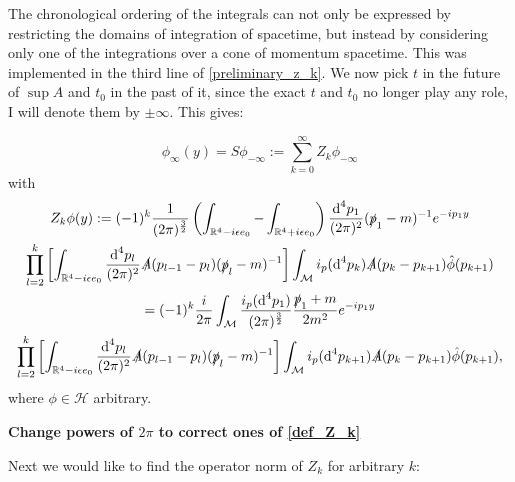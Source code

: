 \documentclass[a4paper,12pt]{article}
\begin{document}
The chronological ordering of the integrals can not only be expressed by restricting the domains of integration of spacetime, but instead by considering only one of the integrations over a cone of momentum spacetime. This was implemented in the third line of \eqref{preliminary_z_k}. We now pick \(t\) in the future of \(\sup A\) and \(t_0\) in the past of it, since the exact \(t\) and \(t_0\) no longer play any role, I will denote them by \(\pm \infty\). This gives:

\begin{equation}
\phi_\infty(y)=S \phi_{-\infty} :=\sum_{k=0}^\infty Z_k \phi_{-\infty}
\end{equation} 
with
\begin{multline}\label{def_Z_k}
Z_k\phi(y):=(-1)^k \frac{1}{(2\pi)^{\frac{3}{2}}}\left( \int_{\mathbb{R}^4-i \epsilon e_0}-\int_{\mathbb{R}^4+i \epsilon e_0} \right) \frac{\text{d}^4p_1}{(2\pi)^{2}} (\slashed{p}_1-m)^{-1} e^{-ip_1y}  \\
  \prod_{l=2}^{k} \left[ \int_{\mathbb{R}^4-i \epsilon e_0}\frac{\text{d}^4p_l}{(2\pi)^{2}} \slashed{A}(p_{l-1}-p_l)  (\slashed{p}_l-m)^{-1}  
 \right]\int_{\mathcal{M}}  i_p(\text{d}^4p_k)\slashed{A}(p_{k}-p_{k+1})\hat{\phi}(p_{k+1})\\
 =(-1)^k \frac{i}{2\pi}  \int_{\mathcal{M}}\frac{i_p(\text{d}^4p_1)}{(2\pi)^{\frac{3}{2}}} \frac{\slashed{p}_1+m}{2m^2} e^{-ip_1y}  \\
  \prod_{l=2}^{k} \left[ \int_{\mathbb{R}^4-i \epsilon e_0}\frac{\text{d}^4p_l}{(2\pi)^{2}} \slashed{A}(p_{l-1}-p_l)  (\slashed{p}_l-m)^{-1}  
 \right]\int_{\mathcal{M}}  i_p(\text{d}^4p_{k+1})\slashed{A}(p_{k}-p_{k+1})\hat{\phi}(p_{k+1}),
\end{multline}
where \(\phi\in \mathcal{H}\) arbitrary.

{\Huge \bf Change powers of \(2\pi\) to correct ones of \eqref{def_Z_k}}

Next we would like to find the operator norm of \(Z_k\) for arbitrary \(k\):
\end{document}
